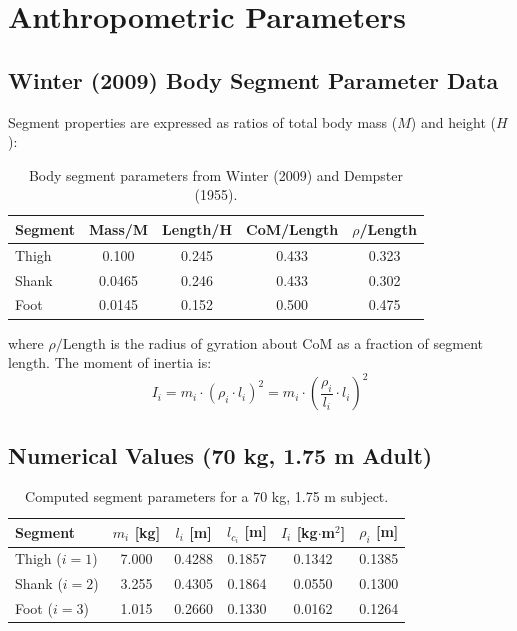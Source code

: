\documentclass[11pt,a4paper]{article}
\begin{document}
\section{Anthropometric Parameters}

\subsection{Winter (2009) Body Segment Parameter Data}

Segment properties are expressed as ratios of total body mass ($M$) and height ($H$):

\begin{table}[H]
\centering
\caption{Body segment parameters from Winter (2009) and Dempster (1955).}
\label{tab:bsp}
\begin{tabular}{@{}lcccc@{}}
\toprule
\textbf{Segment} & \textbf{Mass/M} & \textbf{Length/H} & \textbf{CoM/Length} & \textbf{$\rho$/Length} \\
\midrule
Thigh  & 0.100  & 0.245 & 0.433 & 0.323 \\
Shank  & 0.0465 & 0.246 & 0.433 & 0.302 \\
Foot   & 0.0145 & 0.152 & 0.500 & 0.475 \\
\bottomrule
\end{tabular}
\end{table}

where $\rho/\text{Length}$ is the radius of gyration about CoM as a fraction of segment length.
The moment of inertia is:
\begin{equation}
    I_i = m_i \cdot (\rho_i \cdot l_i)^2 = m_i \cdot \left(\frac{\rho_i}{l_i} \cdot l_i\right)^2
    \label{eq:inertia_calc}
\end{equation}

\subsection{Numerical Values (70 kg, 1.75 m Adult)}

\begin{table}[H]
\centering
\caption{Computed segment parameters for a 70 kg, 1.75 m subject.}
\label{tab:numerical_params}
\begin{tabular}{@{}lccccc@{}}
\toprule
\textbf{Segment} & $m_i$ [kg] & $l_i$ [m] & $l_{c_i}$ [m] & $I_i$ [kg$\cdot$m$^2$] & $\rho_i$ [m] \\
\midrule
Thigh ($i=1$) & 7.000 & 0.4288 & 0.1857 & 0.1342 & 0.1385 \\
Shank ($i=2$) & 3.255 & 0.4305 & 0.1864 & 0.0550 & 0.1300 \\
Foot  ($i=3$) & 1.015 & 0.2660 & 0.1330 & 0.0162 & 0.1264 \\
\bottomrule
\end{tabular}
\end{table}
\end{document}
